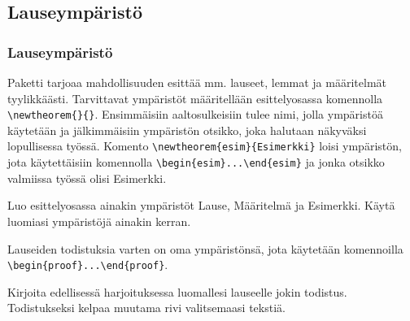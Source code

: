 \subsection{Lauseympäristö}
\begin{fframe}
    \frametitle{Lauseympäristö}
    Paketti  tarjoaa mahdollisuuden esittää mm. lauseet, lemmat ja määritelmät tyylikkäästi. 
    \vaihto
    Tarvittavat ympäristöt määritellään esittelyosassa komennolla \lstinline-\newtheorem{}{}-. Ensimmäisiin aaltosulkeisiin tulee nimi, jolla ympäristöä käytetään ja jälkimmäisiin ympäristön otsikko, joka halutaan näkyväksi lopullisessa työssä.
    \vaihto
Komento \lstinline-\newtheorem{esim}{Esimerkki}- loisi ympäristön, jota käytettäisiin komennolla \lstinline-\begin{esim}...\end{esim}- ja jonka otsikko valmiissa työssä olisi Esimerkki. 
\end{fframe}

\begin{fframe}
    \begin{harj}
        \label{harjYmparistot}
        Luo esittelyosassa ainakin ympäristöt Lause, Määritelmä ja Esimerkki. Käytä luomiasi ympäristöjä ainakin kerran. 
    \end{harj}
    Lauseiden todistuksia varten on oma ympäristönsä, jota käytetään komennoilla \lstinline-\begin{proof}...\end{proof}-.
    \begin{harj}
        Kirjoita edellisessä harjoituksessa luomallesi lauseelle jokin todistus. Todistukseksi kelpaa muutama rivi valitsemaasi tekstiä.
    \end{harj}
\end{fframe}


